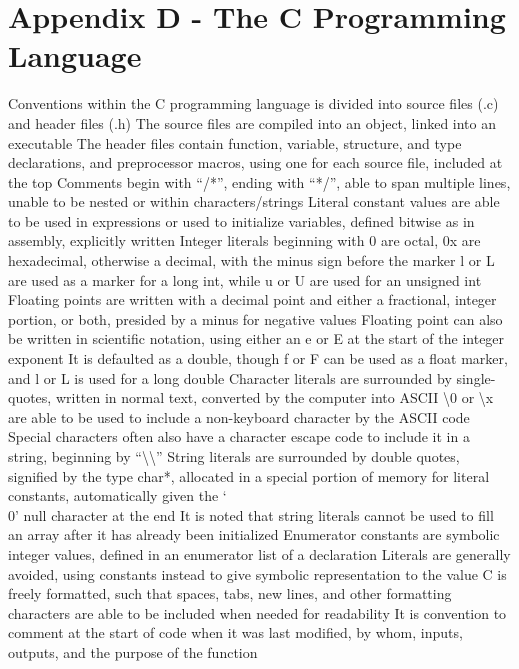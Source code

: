 \documentclass[11 pt, twoside]{article}
\newenvironment{outline*}
{
	\begin{outline}[enumerate]
	}
	{\end{outline}
}
\begin{document}
\section{Appendix D - The C Programming Language}
\begin{outline*}
\1 Conventions within the C programming language is divided into source files (.c) and header files (.h)
\2 The source files are compiled into an object, linked into an executable
\2 The header files contain function, variable, structure, and type declarations, and preprocessor macros, using one for each source file, included at the top
\2 Comments begin with ``/*'', ending with ``*/'', able to span multiple lines, unable to be nested or within characters/strings
\2 Literal constant values are able to be used in expressions or used to initialize variables, defined bitwise as in assembly, explicitly written
\3 Integer literals beginning with 0 are octal, 0x are hexadecimal, otherwise a decimal, with the minus sign before the marker
\4 l or L are used as a marker for a long int, while u or U are used for an unsigned int
\3 Floating points are written with a decimal point and either a fractional, integer portion, or both, presided by a minus for negative values
\4 Floating point can also be written in scientific notation, using either an e or E at the start of the integer exponent
\4 It is defaulted as a double, though f or F can be used as a float marker, and l or L is used for a long double
\3 Character literals are surrounded by single-quotes, written in normal text, converted by the computer into ASCII
\4 \textbackslash 0 or \textbackslash x are able to be used to include a non-keyboard character by the ASCII code
\4 Special characters often also have a character escape code to include it in a string, beginning by ``\textbackslash\textbackslash''
\3 String literals are surrounded by double quotes, signified by the type char*, allocated in a special portion of memory for literal constants, automatically given the `\\0' null character at the end
\4 It is noted that string literals cannot be used to fill an array after it has already been initialized
\3 Enumerator constants are symbolic integer values, defined in an enumerator list of a declaration
\3 Literals are generally avoided, using constants instead to give symbolic representation to the value
\2 C is freely formatted, such that spaces, tabs, new lines, and other formatting characters are able to be included when needed for readability
\3 It is convention to comment at the start of code when it was last modified, by whom, inputs, outputs, and the purpose of the function

\end{outline*}
\end{document}
